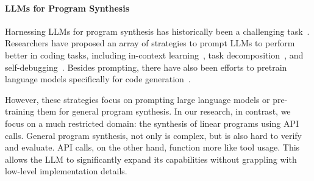 \paragraph{LLMs for Program Synthesis}
Harnessing LLMs for program synthesis has historically been a challenging task~\cite{li2022competition, chen2021evaluating, xu2022systematic, jain2022jigsaw, devlin2017robustfill, lachaux2020unsupervised}. Researchers have proposed an array of strategies to prompt LLMs to perform better in coding tasks, including in-context learning~\cite{wei2022chain, kojima2022large, chen2021evaluating}, task decomposition~\cite{kim2023language, yao2022react}, and self-debugging~\cite{chen2023teaching, shinn2023reflexion}. Besides prompting, there have also been efforts to pretrain language models specifically for code generation~\cite{nijkamp2022codegen, li2023starcoder, nijkamp2023codegen2}.

However, these strategies focus on prompting large language models or pre-training them for general program synthesis. In our research, in contrast, we focus on a much restricted domain: the synthesis of linear programs using API calls. General program synthesis, not only is complex, but is also hard to verify and evaluate. API calls, on the other hand, function more like tool usage. This allows the LLM to significantly expand its capabilities without grappling with low-level implementation details.